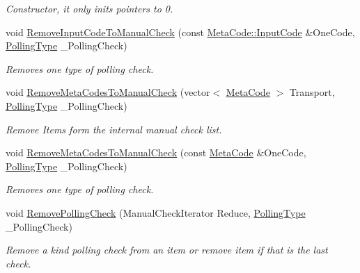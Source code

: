 \begin{DoxyCompactItemize}
\begin{DoxyCompactList}\small\item\em Constructor, it only inits pointers to 0. \item\end{DoxyCompactList}\item 
void \hyperlink{structphys_1_1internal_1_1EventManagerInternalData_aadc9e786da13f2c669fc7e054d8fbf37}{RemoveInputCodeToManualCheck} (const \hyperlink{classphys_1_1MetaCode_a3e501cbb5bf0f6f1fdb7211465bda8d8}{MetaCode::InputCode} \&OneCode, \hyperlink{structphys_1_1internal_1_1EventManagerInternalData_ab9ab8380b84448aacf46a63050e159af}{PollingType} \_\-PollingCheck)
\begin{DoxyCompactList}\small\item\em Removes one type of polling check. \item\end{DoxyCompactList}\item 
void \hyperlink{structphys_1_1internal_1_1EventManagerInternalData_a54babcae1822814f09beace684f97e72}{RemoveMetaCodesToManualCheck} (vector$<$ \hyperlink{classphys_1_1MetaCode}{MetaCode} $>$ Transport, \hyperlink{structphys_1_1internal_1_1EventManagerInternalData_ab9ab8380b84448aacf46a63050e159af}{PollingType} \_\-PollingCheck)
\begin{DoxyCompactList}\small\item\em Remove Items form the internal manual check list. \item\end{DoxyCompactList}\item 
void \hyperlink{structphys_1_1internal_1_1EventManagerInternalData_ade8d03121322cc467086d08df286cd51}{RemoveMetaCodesToManualCheck} (const \hyperlink{classphys_1_1MetaCode}{MetaCode} \&OneCode, \hyperlink{structphys_1_1internal_1_1EventManagerInternalData_ab9ab8380b84448aacf46a63050e159af}{PollingType} \_\-PollingCheck)
\begin{DoxyCompactList}\small\item\em Removes one type of polling check. \item\end{DoxyCompactList}\item 
void \hyperlink{structphys_1_1internal_1_1EventManagerInternalData_ab5d884b9731f79069ae4bd890dd15748}{RemovePollingCheck} (ManualCheckIterator Reduce, \hyperlink{structphys_1_1internal_1_1EventManagerInternalData_ab9ab8380b84448aacf46a63050e159af}{PollingType} \_\-PollingCheck)
\begin{DoxyCompactList}\small\item\em Remove a kind polling check from an item or remove item if that is the last check. \item\end{DoxyCompactList}\end{DoxyCompactItemize}

